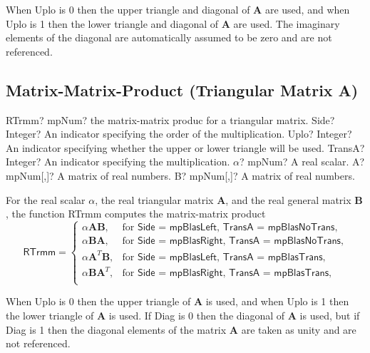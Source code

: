 When \textsf{Uplo} is 0 then the upper triangle and diagonal of $\boldsymbol{A}$ are used, and when \textsf{Uplo} is 1 then the lower triangle and diagonal of $\boldsymbol{A}$ are used. The imaginary elements of the diagonal are automatically assumed to be zero and are not referenced. 






\newpage
\subsection{Matrix-Matrix-Product (Triangular Matrix A)}

\begin{mpFunctionsExtract}
	\mpFunctionSix
	{RTrmm? mpNum? the matrix-matrix produc for a triangular matrix.}
	{Side? Integer? An indicator specifying the order of the multiplication.}
	{Uplo? Integer? An indicator specifying whether the upper or lower triangle will be used.}
	{TransA? Integer? An indicator specifying the multiplication.}
	{$\alpha$? mpNum? A real scalar.}
	{A? mpNum[,]? A matrix of real numbers.}
	{B? mpNum[,]? A matrix of real numbers.}
\end{mpFunctionsExtract}

\vspace{0.3cm}
For the real scalar $\alpha$, the real triangular matrix $\boldsymbol{A}$, and  the real general matrix $\boldsymbol{B}$, the function \textsf{RTrmm} computes the matrix-matrix product
\begin{equation}
\textsf{RTrmm}=\begin{cases}
\alpha \boldsymbol{A} \boldsymbol{B}, & \text{for } \textsf{Side = mpBlasLeft, TransA = mpBlasNoTrans},\\
\alpha \boldsymbol{B} \boldsymbol{A}, & \text{for } \textsf{Side = mpBlasRight, TransA = mpBlasNoTrans},\\
\alpha \boldsymbol{A}^T \boldsymbol{B}, & \text{for } \textsf{Side = mpBlasLeft, TransA = mpBlasTrans},\\
\alpha \boldsymbol{B} \boldsymbol{A}^T, & \text{for } \textsf{Side = mpBlasRight, TransA = mpBlasTrans},\\
\end{cases}
\end{equation}

When \textsf{Uplo} is 0 then the upper triangle of $\boldsymbol{A}$ is used, and when \textsf{Uplo} is 1 then the lower triangle of $\boldsymbol{A}$ is used. If \textsf{Diag} is 0 then the diagonal of $\boldsymbol{A}$ is used, but if \textsf{Diag} is 1 then the diagonal elements of the matrix $\boldsymbol{A}$ are taken as unity and are not referenced. 


